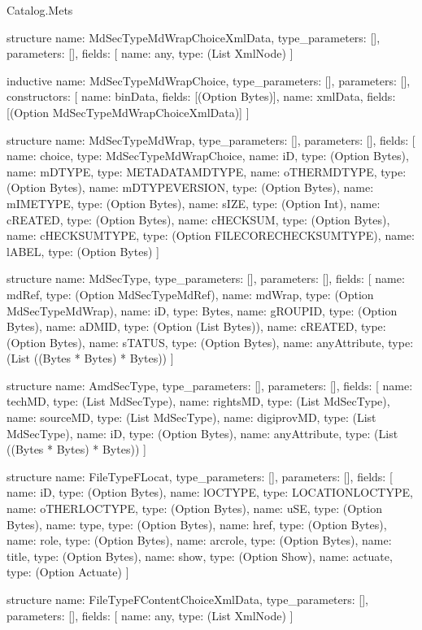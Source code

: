 \begin{lexlean}{Catalog.Mets}
\begin{semanticmodule}
structure{
  name: MdSecTypeMdWrapChoiceXmlData,
  type_parameters: [],
  parameters: [],
  fields: [
    {name: any, type: (List XmlNode)}
  ]
}

inductive{
  name: MdSecTypeMdWrapChoice,
  type_parameters: [],
  parameters: [],
  constructors: [
    {name: binData, fields: [(Option Bytes)]},
    {name: xmlData, fields: [(Option MdSecTypeMdWrapChoiceXmlData)]}
  ]
}

structure{
  name: MdSecTypeMdWrap,
  type_parameters: [],
  parameters: [],
  fields: [
    {name: choice, type: MdSecTypeMdWrapChoice},
    {name: iD, type: (Option Bytes)},
    {name: mDTYPE, type: METADATAMDTYPE},
    {name: oTHERMDTYPE, type: (Option Bytes)},
    {name: mDTYPEVERSION, type: (Option Bytes)},
    {name: mIMETYPE, type: (Option Bytes)},
    {name: sIZE, type: (Option Int)},
    {name: cREATED, type: (Option Bytes)},
    {name: cHECKSUM, type: (Option Bytes)},
    {name: cHECKSUMTYPE, type: (Option FILECORECHECKSUMTYPE)},
    {name: lABEL, type: (Option Bytes)}
  ]
}

structure{
  name: MdSecType,
  type_parameters: [],
  parameters: [],
  fields: [
    {name: mdRef, type: (Option MdSecTypeMdRef)},
    {name: mdWrap, type: (Option MdSecTypeMdWrap)},
    {name: iD, type: Bytes},
    {name: gROUPID, type: (Option Bytes)},
    {name: aDMID, type: (Option (List Bytes))},
    {name: cREATED, type: (Option Bytes)},
    {name: sTATUS, type: (Option Bytes)},
    {name: anyAttribute, type: (List ((Bytes * Bytes) * Bytes))}
  ]
}

structure{
  name: AmdSecType,
  type_parameters: [],
  parameters: [],
  fields: [
    {name: techMD, type: (List MdSecType)},
    {name: rightsMD, type: (List MdSecType)},
    {name: sourceMD, type: (List MdSecType)},
    {name: digiprovMD, type: (List MdSecType)},
    {name: iD, type: (Option Bytes)},
    {name: anyAttribute, type: (List ((Bytes * Bytes) * Bytes))}
  ]
}

structure{
  name: FileTypeFLocat,
  type_parameters: [],
  parameters: [],
  fields: [
    {name: iD, type: (Option Bytes)},
    {name: lOCTYPE, type: LOCATIONLOCTYPE},
    {name: oTHERLOCTYPE, type: (Option Bytes)},
    {name: uSE, type: (Option Bytes)},
    {name: type, type: (Option Bytes)},
    {name: href, type: (Option Bytes)},
    {name: role, type: (Option Bytes)},
    {name: arcrole, type: (Option Bytes)},
    {name: title, type: (Option Bytes)},
    {name: show, type: (Option Show)},
    {name: actuate, type: (Option Actuate)}
  ]
}

structure{
  name: FileTypeFContentChoiceXmlData,
  type_parameters: [],
  parameters: [],
  fields: [
    {name: any, type: (List XmlNode)}
  ]
}


\end{semanticmodule}
\end{lexlean}
